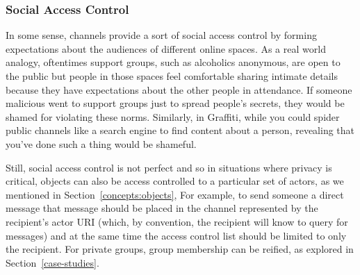 


\subsubsection{Social Access Control}

In some sense, channels provide a sort of social access control by forming
expectations about the audiences of different online spaces.
As a real world analogy, oftentimes support groups, such as alcoholics
anonymous, are open to the public but people in those spaces feel comfortable sharing intimate details
because they have expectations about the other people in attendance.
If someone malicious went to support groups just to spread people's secrets,
they would be shamed for violating these norms.
Similarly, in Graffiti, while you could spider public channels like a search engine
to find content about a person, revealing that you've done such a thing
would be shameful.

Still, social access control is not perfect and so in situations where privacy is critical,
objects can also be access controlled to a particular set of actors,
as we mentioned in Section~\ref{concepts:objects},
For example, to send someone a direct message that message should be placed in
the channel represented by the recipient's actor URI (which, by convention,
the recipient will know to query for messages) and at the same time the
access control list should be limited to only the recipient.
For private groups, group membership can be reified, as explored in Section~\ref{case-studies}.
